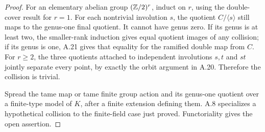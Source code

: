 \begin{proof}
For an elementary abelian group $(\mathbb Z/2)^r$, induct on
$r$, using the double-cover result for $r=1$. For each
nontrivial involution $s$, the quotient $C/\langle s\rangle$
still maps to the genus-one final quotient. It cannot have
genus zero. If its genus is at least two, the smaller-rank
induction gives equal quotient images of any collision;
if its genus is one, A.21 gives that equality for the
ramified double map from $C$. For $r\ge2$, the three
quotients attached to independent involutions $s,t$ and
$st$ jointly separate every point, by exactly the orbit
argument in A.20. Therefore the collision is trivial.

Spread the tame map or tame finite group action and its
genus-one quotient over a finite-type model of $K$, after
a finite extension defining them. A.8 specializes a
hypothetical collision to the finite-field case just
proved. Functoriality gives the open assertion.
\end{proof}






